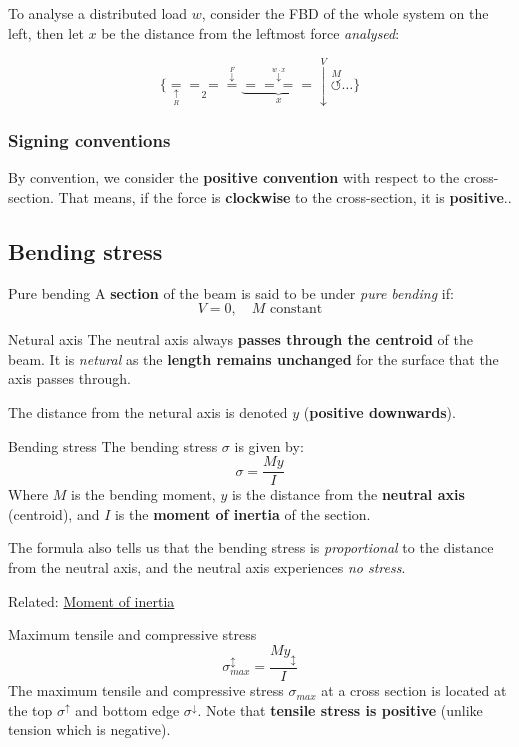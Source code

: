 \vspace{1cm}
To analyse a distributed load $w$, consider the FBD of the whole system on the left, then let $x$ be the distance from the leftmost force \emph{analysed}:

\large
\[\{\underset{\underset{R}{\uparrow}}{=}\underset{2}{==}\overset{\overset{F}{\downarrow}}{=}\underbrace{\overset{\overset{w\cdot x}{\downarrow}}{====}}_x\overset{V}{\downarrow}\overset{M}{\circlearrowleft}\dots\}\]

\subsubsection{Signing conventions}
By convention, we consider the \textbf{positive convention} with respect to the cross-section. That means, if the force is \textbf{clockwise} to the cross-section, it is \textbf{positive}..

\label{sec:bendingstress}
\subsection{Bending stress}
\begin{definition}
    {Pure bending}
    A \textbf{section} of the beam is said to be under \emph{pure bending} if:
    \[V=0,\quad M\text{ constant}\]
\end{definition}
\begin{knBox}
    {Netural axis}
    The neutral axis always \textbf{passes through the centroid} of the beam. It is \emph{netural} as the \textbf{length remains unchanged} for the surface that the axis passes through.

    The distance from the netural axis is denoted $y$ (\textbf{positive downwards}).
\end{knBox}
\begin{theorem}
    {Bending stress}
    The bending stress $\sigma$ is given by:
    \[\sigma=\frac{My}{I}\]
    Where $M$ is the bending moment, $y$ is the distance from the \textbf{neutral axis} (centroid), and $I$ is the \textbf{moment of inertia} of the section.

    The formula also tells us that the bending stress is \emph{proportional} to the distance from the neutral axis, and the neutral axis experiences \emph{no stress}.

    Related: \hyperref[sec:momentinertia]{Moment of inertia}
\end{theorem}
\begin{theorem}
    {Maximum tensile and compressive stress}
    \[\sigma^\updownarrow_{max}=\frac{My_\updownarrow}{I}\]
    The maximum tensile and compressive stress $\sigma_{max}$ at a cross section is located at the top $\sigma^\uparrow$  and bottom edge $\sigma^\downarrow$. Note that \textbf{tensile stress is positive} (unlike tension which is negative).
\end{theorem}
